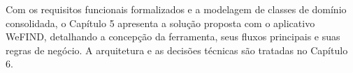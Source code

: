 Com os requisitos funcionais formalizados e a modelagem de classes de domínio consolidada, o Capítulo 5 apresenta a solução proposta com o aplicativo WeFIND, detalhando a concepção da ferramenta, seus fluxos principais e suas regras de negócio. A arquitetura e as decisões técnicas são tratadas no Capítulo 6.
